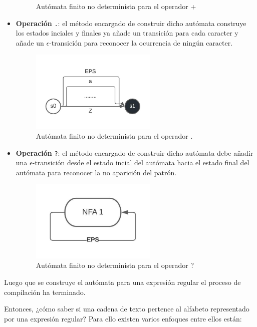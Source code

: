 \begin{itemize}
\begin{figure}
                        \caption{Autómata finito no determinista para el operador +}
                \end{figure}
        \item \textbf{Operación} \verb|.|: el método encargado de construir dicho autómata construye los estados inciales y finales ya añade un transición para cada caracter y añade un $\epsilon$-transición para reconocer la ocurrencia de ningún caracter.
                \begin{figure}
                        \centering
                        \includegraphics[width=6cm]{./chapters/img/dot.jpeg}
                        \caption{Autómata finito no determinista para el operador .}
                \end{figure}
        \item \textbf{Operación} \verb|?|: el método encargado de construir dicho autómata debe añadir una $\epsilon$-transición desde el estado incial del autómata hacia el estado final del autómata para reconocer la no aparición del patrón.
                \begin{figure}
                        \centering
                        \includegraphics[width=6cm]{./chapters/img/qmark.jpeg}
                        \caption{Autómata finito no determinista para el operador ?}
                \end{figure}
\end{itemize}

Luego que se construye el autómata para una expresión regular  el proceso de compilación ha terminado. 

Entonces, ¿cómo saber si una cadena de texto pertence al alfabeto representado por una expresión regular? Para ello existen varios enfoques entre ellos están:

